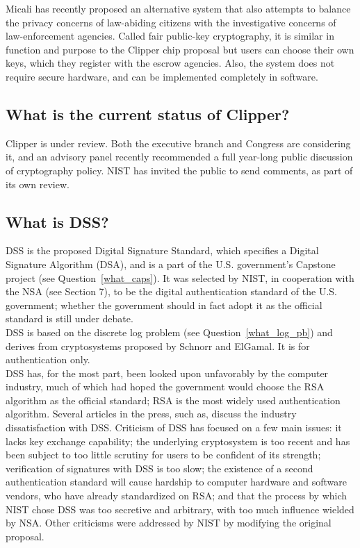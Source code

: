 Micali has recently proposed an alternative system that also attempts
to balance the privacy concerns of law-abiding citizens with the
investigative concerns of law-enforcement agencies. Called fair
public-key cryptography, it is similar in function and purpose to the
Clipper chip proposal but users can choose their own keys, which they
register with the escrow agencies. Also, the system does not require
secure hardware, and can be implemented completely in software.

\subsection{What is the current status of Clipper?}

Clipper is under review. Both the executive branch and Congress are
considering it, and an advisory panel recently recommended a full
year-long public discussion of cryptography policy. NIST has invited
the public to send comments, as part of its own review.

\subsection{What is DSS?}
\label{what_dss}

DSS is the proposed Digital Signature Standard, which specifies a Digital
Signature Algorithm (DSA), and is a part of the U.S.  government's Capstone
project (see Question~\ref{what_caps}). It was selected by NIST, in
cooperation with the NSA (see Section 7), to be the digital authentication
standard of the U.S. government; whether the government should in fact
adopt it as the official standard is still under debate.\\

DSS is based on the discrete log problem (see Question~\ref{what_log_pb})
and derives from cryptosystems proposed by Schnorr and ElGamal. It is for
authentication only.\\

DSS has, for the most part, been looked upon unfavorably by the
computer industry, much of which had hoped the government would choose
the RSA algorithm as the official standard; RSA is the most widely used
authentication algorithm. Several articles in the press, such as,
discuss the industry dissatisfaction with DSS. Criticism of DSS has
focused on a few main issues: it lacks key exchange capability; the
underlying cryptosystem is too recent and has been subject to too
little scrutiny for users to be confident of its strength; verification
of signatures with DSS is too slow; the existence of a second
authentication standard will cause hardship to computer hardware and
software vendors, who have already standardized on RSA; and that the
process by which NIST chose DSS was too secretive and arbitrary, with
too much influence wielded by NSA. Other criticisms were addressed by
NIST by modifying the original proposal.\\

